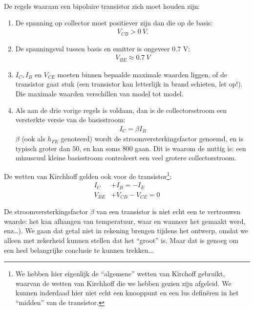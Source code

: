 \documentclass{article}
\begin{document}
				De regels waaraan een bipolaire transistor zich moet houden zijn:
				\begin{enumerate}
					\item De spanning op collector moet positiever zijn dan die op de basis: 
					\begin{align}
					    V_{CB} > 0~V. 
					\end{align}

					\item De spanningsval tussen basis en emitter is ongeveer $0.7$ V: 
					\begin{align}
					    V_{BE} \approx 0.7~V
					\end{align}

					\item $I_C, I_B$ en $V_{CE} $ moeten binnen bepaalde maximale waarden liggen, of de transistor gaat stuk (een transistor kan letterlijk in brand schieten, let op!). Die maximale waarden verschillen van model tot model.

					\item Als aan de drie vorige regels is voldaan, dan is de collectorsstroom een versterkte versie van de basisstroom: 
					\begin{align}
					    I_C = \beta I_B
					    \label{eq:hfe}
					\end{align}
					$\beta$ (ook als $h_{FE}$ genoteerd) wordt de stroomversterkingsfactor genoemd, en is typisch groter dan $50$, en kan soms $800$ gaan. Dit is waarom de nuttig is: een minuscuul kleine basisstroom controleert een veel grotere collectorstroom.

				\end{enumerate}

				De wetten van Kirchhoff gelden ook voor de transistor\footnote{We hebben hier eigenlijk de ``algemene'' wetten van Kirchoff gebruikt, waarvan de wetten van Kirchhoff die we hebben gezien zijn afgeleid. We kunnen inderdaad hier niet echt een knooppunt en een lus defin\"eren in het ``midden'' van de transistor.}:
				\begin{align}
				    I_C		&+ I_B = -I_E \\
				    V_{BE}  &+ V_{CB} - V_{CE} = 0
				\end{align}

				De stroomversterkingsfactor $\beta$ van een transistor is niet echt een te vertrouwen waarde: het kan afhangen van temperatuur, waar en wanneer het gemaakt werd, enz\ldots). We gaan dat getal niet in rekening brengen tijdens het ontwerp, omdat we alleen met zekerheid kunnen stellen dat het ``groot'' is. Maar dat is genoeg om een heel belangrijke conclusie te kunnen trekken...
\end{document}
